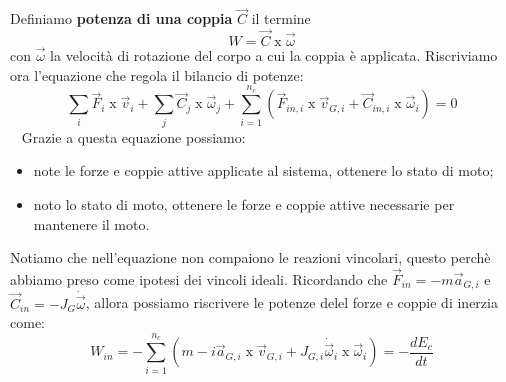 \newline
Definiamo \textbf{potenza di una coppia} $\vec{C}$ il termine
\[
    W = \vec{C} \;\text{x}\; \vec{\omega}
\]
con $\vec{\omega}$ la velocità di rotazione del corpo a cui la coppia è applicata.
\newline
\newline
Riscriviamo ora l'equazione che regola il bilancio di potenze:
\[
    \sum_i \vec{F}_i \;\text{x}\; \vec{v}_i + \sum_j \vec{C}_j \;\text{x}\;\vec{\omega}_j + \sum_{i=1}^{n_c}\left( \vec{F}_{in,i} \;\text{x}\;\vec{v}_{G,i} + \vec{C}_{in,i} \;\text{x}\;\vec{\omega}_i \right) = 0
\]
\ \newline
Grazie a questa equazione possiamo:
\begin{itemize}
    \item note le forze e coppie attive applicate al sistema, ottenere lo stato di moto;
    \item noto lo stato di moto, ottenere le forze e coppie attive necessarie per mantenere il moto.
\end{itemize}
Notiamo che nell'equazione non compaiono le reazioni vincolari, questo perchè abbiamo preso come ipotesi dei vincoli ideali.\newline
\newline
Ricordando che $\vec{F}_{in} = - m \vec{a}_{G,i}$ e $\vec{C}_{in} = - J_G \dot{\vec{\omega}}$, allora possiamo riscrivere le potenze delel forze e coppie di inerzia come:
\[
    W_{in} = - \sum_{i=1}^{n_c} \left( m-i \vec{a}_{G,i} \;\text{x}\; \vec{v}_{G,i} + J_{G,i} \dot{\vec{\omega}}_i \;\text{x}\;\vec{\omega}_i \right) = - \frac{d E_c}{dt}
\]
\newline
